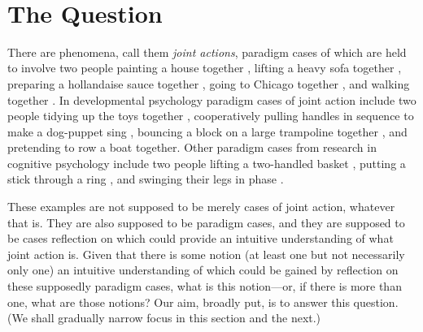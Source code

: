 \documentclass[12pt,a4paper]{extarticle}
\begin{document}
\ 


\section{The Question}
	\label{section_the_question}

There are phenomena, call them \emph{joint actions}, paradigm cases of which are held to involve two people 
	painting a house together \citep{Bratman:1992mi}, 
	lifting a heavy sofa together \citep{Velleman:1997oo}, 
	preparing a hollandaise sauce together \citep{Searle:1990em}, 
	going to Chicago together \citep{Kutz:2000si}, 
	and walking together \citep{gilbert_walking_1990}.
In developmental psychology paradigm cases of joint action include  two people 
	tidying up the toys together \citep{Behne:2005qh},
	cooperatively pulling handles in sequence to make a dog-puppet sing \citep{Brownell:2006gu},
	bouncing a block on a large trampoline together \citep{Tomasello:2007gl},
	and pretending to row a boat together.
Other paradigm cases from research in cognitive psychology include two people
	lifting a two-handled basket  \citep{Knoblich:2008hy},
	putting a stick through a ring \citep{ramenzoni_joint_2011},
	and swinging their legs in phase \citep[p. 284]{schmidt_richardons:_2008}.

These examples are not supposed to be merely cases of joint action, whatever that is.
They are also supposed to be paradigm cases, 
and they are supposed to be cases reflection on which could provide an intuitive understanding of what joint action is.
Given that there is some notion (at least one but not necessarily only one) an intuitive understanding of which could be gained by reflection on these supposedly paradigm cases, what is this notion---or, if there is more than one, what are those notions?
Our aim, broadly put, is to answer this question.
(We shall gradually narrow focus in this section and the next.)
\end{document}
